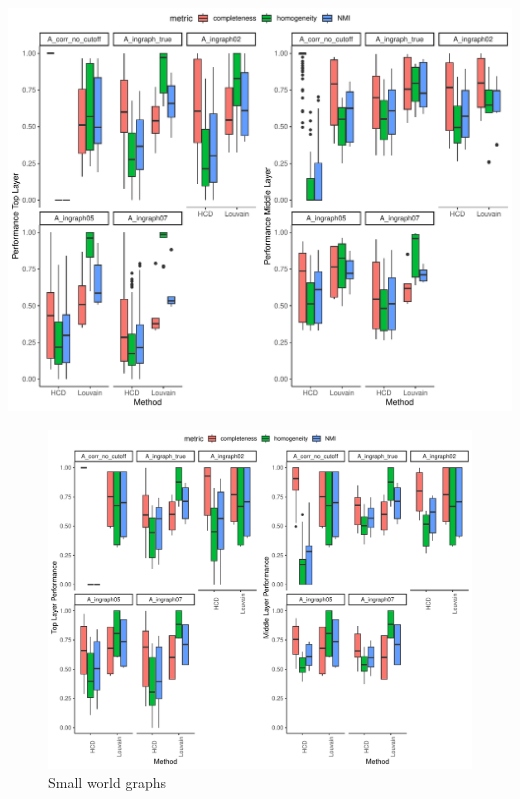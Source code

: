 \documentclass[
]{article}
\begin{document}
\includegraphics{Lab_report_4_1_2024_files/figure-latex/unnamed-chunk-7-1.pdf}

\begin{figure}
\centering
\includegraphics{Lab_report_4_1_2024_files/figure-latex/unnamed-chunk-8-1.pdf}
\caption{Small world graphs}
\end{figure}
\end{document}
